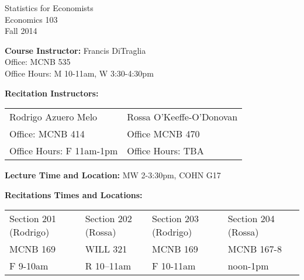 \documentclass[11pt, letterpaper]{article}
\begin{document}
\thispagestyle{plain}

\begin{center}
\Large
\sc
Statistics for Economists\\
\large
Economics 103\\
\large
Fall 2014\\
\end{center}


\normalsize

\noindent \textbf{Course Instructor:} Francis DiTraglia \\
Office: MCNB 535\\
Office Hours: M 10-11am, W 3:30-4:30pm

\medskip


\noindent \textbf{Recitation Instructors:}

\medskip
\noindent


\begin{tabular}{ll}
Rodrigo Azuero Melo & Rossa O'Keeffe-O'Donovan\\
Office: MCNB 414 & Office MCNB 470\\ 
Office Hours: F 11am-1pm & Office Hours: TBA\\
\end{tabular}

\medskip


 
\noindent \textbf{Lecture Time and Location:} MW 2-3:30pm, COHN G17  

\medskip

\noindent \textbf{Recitations Times and Locations:}
\medskip \noindent

\begin{tabular}{lllll}
	Section 201 (Rodrigo) & Section 202 (Rossa) & Section 203 (Rodrigo) & Section 204 (Rossa)\\
	MCNB 169 & WILL 321 & MCNB 169 & MCNB 167-8 \\ 
	F 9-10am & R 10--11am & F 10-11am & noon-1pm
\end{tabular}
\end{document}
